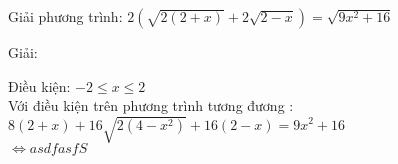 \begin{vd}
  Giải phương trình: $ 2\left(\sqrt{2(2+x)}+2\sqrt{2-x}\right) = \sqrt{9x^2+16} $
\end{vd}
\begin{center}
    Giải:
\end{center}

Điều kiện: $ -2 \leq x \leq 2 $ \\
Với điều kiện trên phương trình tương đương : \\
$ 8(2+x) + 16\sqrt{2(4-x^2)} + 16(2-x) = 9x^2+16 $ \\
$ \Leftrightarrow 
asdfasfS    
$

